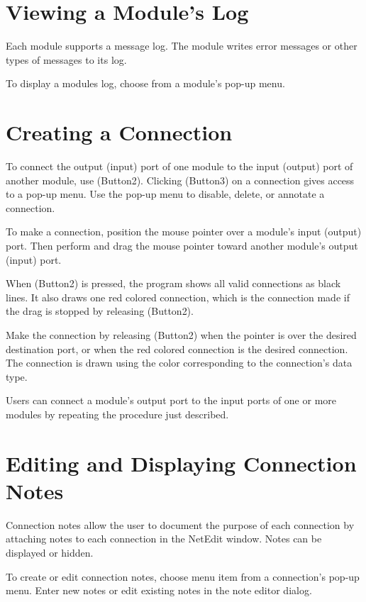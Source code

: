 \section{Viewing a Module's Log}
\label{sec:viewmodslog}

Each module supports a message log. The module writes error messages
or other types of messages to its log.

To display a modules log, choose  from a module's
pop-up menu.


\section{Creating a Connection}
\label{sec:connectmods}

To connect the output (input) port of one module to the input (output)
port of another module, use \keyboard(Button2). Clicking
\keyboard(Button3) on a connection gives access to a pop-up menu. Use
the pop-up menu to disable, delete, or annotate a connection.

To make a connection, position the mouse pointer over a module's input
(output) port.  Then perform  and drag the
mouse pointer toward another module's output (input) port.

When \keyboard(Button2) is pressed, the program shows all valid connections as black
lines.  It also draws one red colored connection, which is the
connection made if the drag is stopped by releasing \keyboard(Button2).

Make the connection by releasing \keyboard(Button2) when the pointer is over the
desired destination port, or when the red colored connection is the
desired connection.  The connection is drawn using the color
corresponding to the connection's data type.

Users can connect a module's output port to the input ports of one or more
modules by repeating the procedure just described.

\section{Editing and Displaying Connection Notes}
\label{sec:displaynotes}

Connection notes allow the user to document the purpose of
each connection by attaching notes to each connection in the NetEdit window.
Notes can be displayed or hidden.

To create or edit connection notes, choose menu item  from
a connection's pop-up menu. Enter new notes or edit existing notes in
the note editor dialog.

